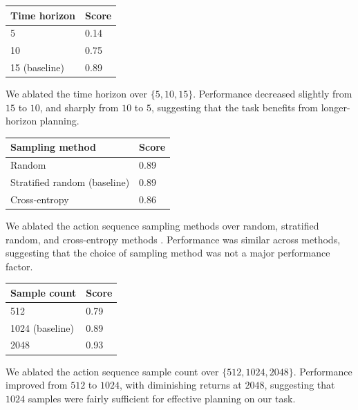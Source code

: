 \documentclass[10pt, twocolumn]{article}
\theoremstyle{definition}
\theoremstyle{remark}
\begin{document}
\begin{center}
\begin{tabular}{ll}
\toprule
\textbf{Time horizon} & \textbf{Score} \\
\midrule
5 & 0.14 \\
10 & 0.75 \\
15 (baseline) & 0.89 \\
\bottomrule
\end{tabular}
\end{center}

We ablated the time horizon
over $\{5, 10, 15\}$.
Performance decreased
slightly from $15$ to $10$,
and sharply from $10$ to $5$,
suggesting that the task benefits from longer-horizon planning.

\begin{center}
\begin{tabular}{ll}
\toprule
\textbf{Sampling method} & \textbf{Score} \\
\midrule
Random & 0.89 \\
Stratified random (baseline) & 0.89 \\
Cross-entropy & 0.86 \\
\bottomrule
\end{tabular}
\end{center}

We ablated the action sequence sampling methods
over random, stratified random, and cross-entropy methods \citep{rubinstein1999crossentropy}.
Performance was similar across methods, suggesting that the choice of sampling method was not a major performance factor.

\begin{center}
\begin{tabular}{ll}
\toprule
\textbf{Sample count} & \textbf{Score} \\
\midrule
512 & 0.79 \\
1024 (baseline) & 0.89 \\
2048 & 0.93 \\
\bottomrule
\end{tabular}
\end{center}

We ablated the action sequence sample count
over $\{512, 1024, 2048\}$.
Performance improved from $512$ to $1024$,
with diminishing returns at $2048$,
suggesting that $1024$ samples were fairly sufficient for effective planning on our task.
\end{document}
